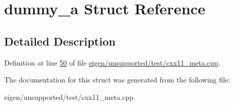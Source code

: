 \hypertarget{structdummy__a}{}\section{dummy\+\_\+a Struct Reference}
\label{structdummy__a}


\subsection{Detailed Description}


Definition at line \hyperlink{eigen_2unsupported_2test_2cxx11__meta_8cpp_source_l00050}{50} of file \hyperlink{eigen_2unsupported_2test_2cxx11__meta_8cpp_source}{eigen/unsupported/test/cxx11\+\_\+meta.\+cpp}.



The documentation for this struct was generated from the following file\+:\begin{DoxyCompactItemize}
\item 
eigen/unsupported/test/cxx11\+\_\+meta.\+cpp\end{DoxyCompactItemize}
